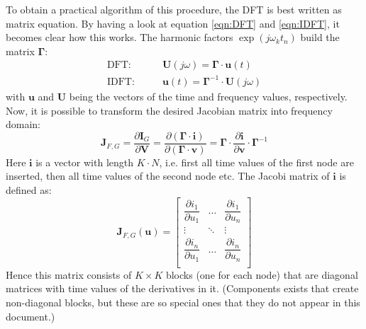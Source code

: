 \addvspace{12pt}

To obtain a practical algorithm of this procedure, the DFT is best written
as matrix equation. By having a look at equation \ref{eqn:DFT} and
\ref{eqn:IDFT}, it becomes clear how this works. The harmonic factors
$\exp(j\omega_k t_n)$ build the matrix $\boldsymbol{\Gamma}$:
\begin{align}
\text{DFT:}  \qquad & \boldsymbol{U}(j\omega) = \boldsymbol{\Gamma}\cdot \boldsymbol{u}(t) \\
\text{IDFT:} \qquad & \boldsymbol{u}(t) = \boldsymbol{\Gamma}^{-1}\cdot \boldsymbol{U}(j\omega)
\end{align}
with $\boldsymbol{u}$ and $\boldsymbol{U}$ being the vectors of the time
and frequency values, respectively. Now, it is possible to transform the
desired Jacobian matrix into frequency domain:
\begin{equation}
\label{eqn:HB_jacobi}
\boldsymbol{J}_{F,G}
  = \frac{\partial\boldsymbol{I}_G}{\partial\boldsymbol{V}}
  = \frac{\partial(\boldsymbol{\Gamma}\cdot\boldsymbol{i})}
         {\partial(\boldsymbol{\Gamma}\cdot\boldsymbol{v})}
  = \boldsymbol{\Gamma}\cdot\frac{\partial\boldsymbol{i}}{\partial\boldsymbol{v}}
    \cdot\boldsymbol{\Gamma}^{-1}
\end{equation}
Here $\boldsymbol{i}$ is a vector with length $K\cdot N$, i.e. first all
time values of the first node are inserted, then all time values of the
second node etc. The Jacobi matrix of $\boldsymbol{i}$ is defined as:
\begin{equation}
\boldsymbol{J}_{F,G}(\boldsymbol{u}) =
\begin{bmatrix}
\dfrac{\partial i_1}{\partial u_1} & \hdots & \dfrac{\partial i_1}{\partial u_n} \\
\vdots & \ddots & \vdots\\
\dfrac{\partial i_n}{\partial u_1} & \hdots & \dfrac{\partial i_n}{\partial u_n} \\
\end{bmatrix}
\end{equation}
Hence this matrix consists of
$K \times K$ blocks (one for each node) that are diagonal matrices with
time values of the derivatives in it. (Components exists that create
non-diagonal blocks, but these are so special ones that they do not appear
in this document.)

\addvspace{12pt}

